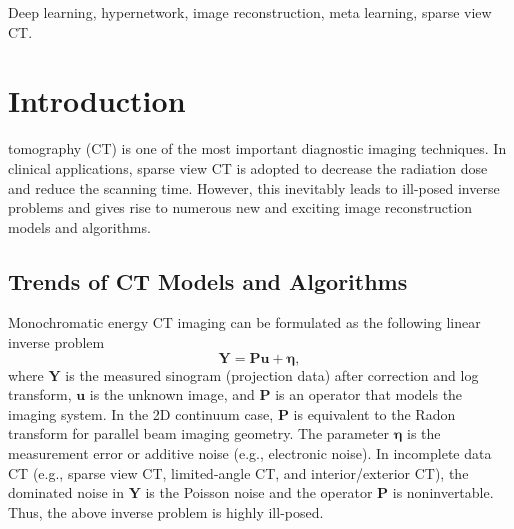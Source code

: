 \documentclass[journal,twoside]{IEEEtran}
\begin{document}
\begin{IEEEkeywords}
Deep learning, hypernetwork, image reconstruction, meta learning, sparse view CT. 
\end{IEEEkeywords}

\section{Introduction}
 tomography (CT) is one of the most important diagnostic imaging techniques. In clinical applications, sparse view CT is adopted to decrease the radiation dose and reduce the scanning time. However, this inevitably leads to ill-posed inverse problems \cite{davison1983the,louis1986incomplete} and gives rise to numerous new and exciting image reconstruction models and algorithms. 

\subsection{Trends of CT Models and Algorithms}
Monochromatic energy CT imaging can be formulated as the following linear inverse problem
$$ \bm{Y}=\bm{P}\bm{u}+\bm{\eta},$$
where $\bm{Y}$ is the measured sinogram (projection data) after correction and log transform, $\bm{u}$ is the unknown image, and $\bm{P}$ is an operator that models the imaging system. In the 2D continuum case, $\bm{P}$ is equivalent to the Radon transform for parallel beam imaging geometry. The parameter $\bm{\eta}$ is the measurement error or additive noise (e.g., electronic noise).  In incomplete data CT (e.g., sparse view CT, limited-angle CT, and interior/exterior CT), the dominated noise in $\bm{Y}$ is the Poisson noise and the operator $\bm{P}$ is noninvertable. Thus, the above inverse problem is highly ill-posed. 
\end{document}
